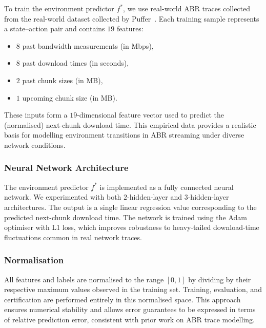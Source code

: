 \documentclass[thesis]{uofithesis} %
\begin{document}
    To train the environment predictor $f^{\ast}$, we use real-world ABR
    traces collected from the real-world dataset collected by Puffer~\cite{fugu}.  Each training
    sample represents a state--action pair and contains $19$ features:
    \begin{itemize}
        \item $8$ past bandwidth measurements (in Mbps),
        \item $8$ past download times (in seconds),
        \item $2$ past chunk sizes (in MB),
        \item $1$ upcoming chunk size (in MB).
    \end{itemize}
    These inputs form a $19$-dimensional feature vector used to predict the
    (normalised) next-chunk download time.  This empirical data provides a
    realistic basis for modelling environment transitions in ABR streaming
    under diverse network conditions.


    \subsubsection{Neural Network Architecture}
    \label{sec:env-nn}

    The environment predictor $f^{\ast}$ is implemented as a fully
    connected neural network.  We experimented with both $2$-hidden-layer
    and $3$-hidden-layer architectures.  The output is a single linear
    regression value corresponding to the predicted next-chunk download
    time.  The network is trained using the Adam optimiser with L1 loss,
    which improves robustness to heavy-tailed download-time fluctuations
    common in real network traces.


    \subsubsection{Normalisation}
    \label{sec:env-norm}

    All features and labels are normalised to the range $[0, 1]$ by
    dividing by their respective maximum values observed in the training
    set.  Training, evaluation, and certification are performed entirely in
    this normalised space.  This approach ensures numerical stability and
    allows error guarantees to be expressed in terms of relative prediction
    error, consistent with prior work on ABR trace modelling.
\end{document}

